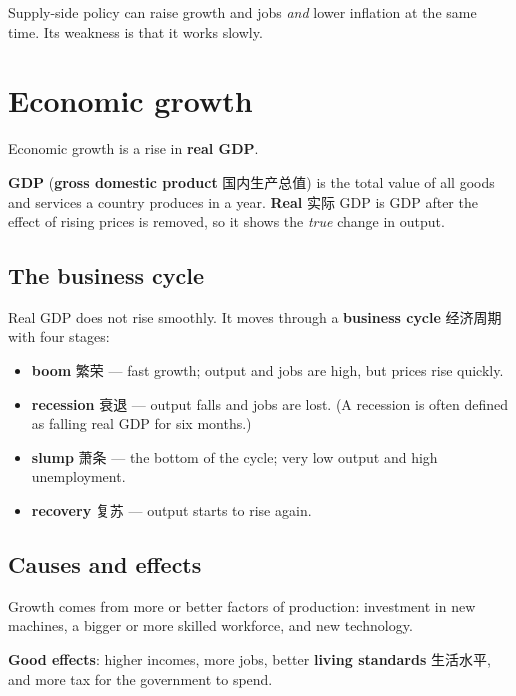 \documentclass[11pt]{article}
\begin{document}
Supply-side policy can raise growth and jobs \emph{and} lower inflation at the same time. Its weakness is that it works slowly.

\section*{Economic growth}

Economic growth is a rise in \textbf{real GDP}.

\textbf{GDP} (\textbf{gross domestic product} 国内生产总值) is the total value of all goods and services a country produces in a year. \textbf{Real} 实际 GDP is GDP after the effect of rising prices is removed, so it shows the \emph{true} change in output.

\subsection*{The business cycle}

Real GDP does not rise smoothly. It moves through a \textbf{business cycle} 经济周期 with four stages:

\begin{itemize}
\item \textbf{boom} 繁荣 — fast growth; output and jobs are high, but prices rise quickly.

\item \textbf{recession} 衰退 — output falls and jobs are lost. (A recession is often defined as falling real GDP for six months.)

\item \textbf{slump} 萧条 — the bottom of the cycle; very low output and high unemployment.

\item \textbf{recovery} 复苏 — output starts to rise again.

\end{itemize}

\subsection*{Causes and effects}

Growth comes from more or better factors of production: investment in new machines, a bigger or more skilled workforce, and new technology.

\textbf{Good effects}: higher incomes, more jobs, better \textbf{living standards} 生活水平, and more tax for the government to spend.
\end{document}

